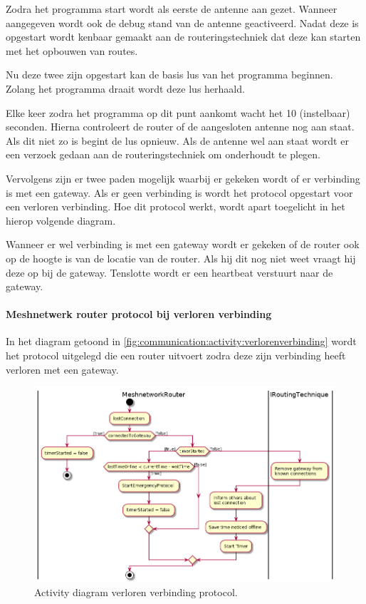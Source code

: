 \documentclass[a4paper, 11pt, oneside]{report}
\begin{document}
Zodra het programma start wordt als eerste de antenne aan gezet. Wanneer aangegeven wordt ook de debug stand van de antenne geactiveerd. 
Nadat deze is opgestart wordt kenbaar gemaakt aan de routeringstechniek dat deze kan starten met het opbouwen van routes.

Nu deze twee zijn opgestart kan de basis lus van het programma beginnen. 
Zolang het programma draait wordt deze lus herhaald.

Elke  keer zodra het programma op dit punt aankomt wacht het 10 (instelbaar) seconden.
Hierna controleert de router of de aangesloten antenne nog aan staat. 
Als dit niet zo is begint de lus opnieuw.
Als de antenne wel aan staat wordt er een verzoek gedaan aan de routeringstechniek om onderhoudt te plegen.

Vervolgens zijn er twee paden mogelijk waarbij er gekeken wordt of er verbinding is met een gateway.
Als er geen verbinding is wordt het protocol opgestart voor een verloren verbinding.
Hoe dit protocol werkt, wordt apart toegelicht in het hierop volgende diagram.

Wanneer er wel verbinding is met een gateway wordt er gekeken  of de router ook op de hoogte is van de locatie van de router.
Als hij dit nog niet weet vraagt hij deze op bij de gateway.
Tenslotte wordt er een heartbeat verstuurt naar de gateway.

\pagebreak
\paragraph{Meshnetwerk router protocol bij verloren verbinding}
\label{DetailedDesign:Communicatie:Activity:verloren}
In het diagram getoond in \autoref{fig:communication:activity:verlorenverbinding} wordt het protocol uitgelegd die een router uitvoert zodra deze zijn verbinding heeft verloren met een gateway.

\begin{figure}[H]
	\begin{center}\includegraphics[width=1\linewidth]{UML/out/Communication/activity/LostConnection/LostConnection.png}\end{center}
	\caption{Activity diagram verloren verbinding protocol.}
	\label{fig:communication:activity:verlorenverbinding}
\end{figure}
\end{document}

